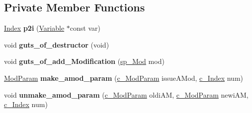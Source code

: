 \subsection*{Private Member Functions}
\begin{DoxyCompactItemize}
\item 
\mbox{\label{class_s_m_spp__di__unipi__it_1_1_m_c_f_block_a78f45ede3117c9ea26ecea57191c743c}} 
\mbox{\hyperlink{class_s_m_spp__di__unipi__it_1_1_m_c_f_block_ad53d6229d7ec28555a9c9c2fd9abf773}{Index}} {\bfseries p2i} (\mbox{\hyperlink{class_s_m_spp__di__unipi__it_1_1_variable}{Variable}} $\ast$const var)
\item 
\mbox{\label{class_s_m_spp__di__unipi__it_1_1_m_c_f_block_addbacfab7e5fc38d3f8ea1f045feb39e}} 
void {\bfseries guts\+\_\+of\+\_\+destructor} (void)
\item 
\mbox{\label{class_s_m_spp__di__unipi__it_1_1_m_c_f_block_a51f5c5087a8c43cacb1651c7f79cbe31}} 
void {\bfseries guts\+\_\+of\+\_\+add\+\_\+\+Modification} (\mbox{\hyperlink{group___modification___t_y_p_e_s_ga9024cf2ead61a1280d29771b063b1a62}{sp\+\_\+\+Mod}} mod)
\item 
\mbox{\label{class_s_m_spp__di__unipi__it_1_1_m_c_f_block_a3bc349c48fbfd57da5b82358f25f0b19}} 
\mbox{\hyperlink{group___modification___t_y_p_e_s_gac8fdf1a69f314970b9aaa9328e3f3907}{Mod\+Param}} {\bfseries make\+\_\+amod\+\_\+param} (\mbox{\hyperlink{group___modification___t_y_p_e_s_ga544246d8c462e9a2d817c2c30797968f}{c\+\_\+\+Mod\+Param}} issue\+A\+Mod, \mbox{\hyperlink{class_s_m_spp__di__unipi__it_1_1_m_c_f_block_aee6156e2ce80720d57a082d80f39d8cc}{c\+\_\+\+Index}} num)
\item 
\mbox{\label{class_s_m_spp__di__unipi__it_1_1_m_c_f_block_ab0644c56e8ffd43aae0859bc11b19f68}} 
void {\bfseries unmake\+\_\+amod\+\_\+param} (\mbox{\hyperlink{group___modification___t_y_p_e_s_ga544246d8c462e9a2d817c2c30797968f}{c\+\_\+\+Mod\+Param}} oldi\+AM, \mbox{\hyperlink{group___modification___t_y_p_e_s_ga544246d8c462e9a2d817c2c30797968f}{c\+\_\+\+Mod\+Param}} newi\+AM, \mbox{\hyperlink{class_s_m_spp__di__unipi__it_1_1_m_c_f_block_aee6156e2ce80720d57a082d80f39d8cc}{c\+\_\+\+Index}} num)

\end{DoxyCompactItemize}

